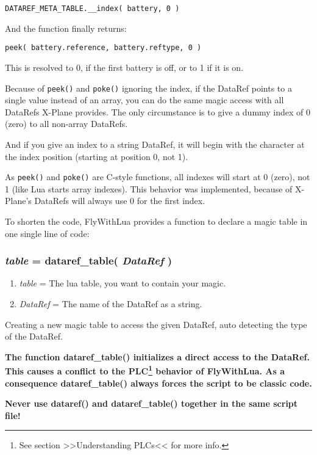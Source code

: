 \documentclass[11pt,parskip=half,a4paper]{scrartcl}
\begin{document}
\verb|DATAREF_META_TABLE.__index( battery, 0 )|

And the function finally returns:

\verb|peek( battery.reference, battery.reftype, 0 )|

This is resolved to 0, if the first battery is off, or to 1 if it is on.

Because of \verb|peek()| and \verb|poke()| ignoring the index, if the DataRef points to a single value instead of an array, you can do the same magic access with all DataRefs X-Plane provides. The only circumstance is to give a dummy index of 0 (zero) to all non-array DataRefs.

And if you give an index to a string DataRef, it will begin with the character at the index position (starting at position 0, not 1).

As \verb|peek()| and \verb|poke()| are C-style functions, all indexes will start at 0 (zero), not 1 (like Lua starts array indexes). This behavior was implemented, because of X-Plane's DataRefs will always use 0 for the first index.

To shorten the code, FlyWithLua provides a function to declare a magic table in one single line of code:

\subsubsection{\emph{table} = dataref\_table( \emph{DataRef} )}

\begin{enumerate}
	\item \emph{table} = The lua table, you want to contain your magic.
	\item \emph{DataRef} = The name of the DataRef as a string.
\end{enumerate}

Creating a new magic table to access the given DataRef, auto detecting the type of the DataRef.

\vspace{2ex}

\textbf{The function dataref\_table() initializes a direct access to the DataRef. This causes a conflict to the PLC\footnote{See section >>Understanding PLCs<< for more info.} behavior of FlyWithLua. As a consequence dataref\_table() always forces the script to be classic code.}

\textbf{Never use dataref() and dataref\_table() together in the same script file!}

\newpage
\end{document}
